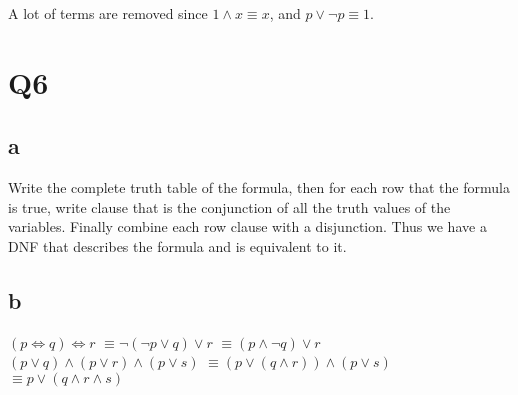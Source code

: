 \documentclass[12pt]{article}
\begin{document}
A lot of terms are removed since $1 \land x \equiv x$, and $p \lor \neg p \equiv 1$.

\section{Q6}
\subsection{a}
Write the complete truth table of the formula, 
then for each row that the formula is true, 
write clause that is the conjunction of all the 
truth values of the variables. Finally combine each 
row clause with a disjunction. Thus we have a 
DNF that describes the formula and is equivalent to it.


\subsection{b}
$(p \iff q) \iff r$
\newline
$\equiv \neg(\neg p \lor q) \lor r$
\newline
$\equiv (p \land \neg q) \lor r$
\newline
$(p \lor q) \land (p \lor r) \land (p \lor s)$
\newline
$\equiv (p \lor (q \land r)) \land (p \lor s)$
\newline
$\equiv p \lor (q \land r \land s)$
\end{document}

